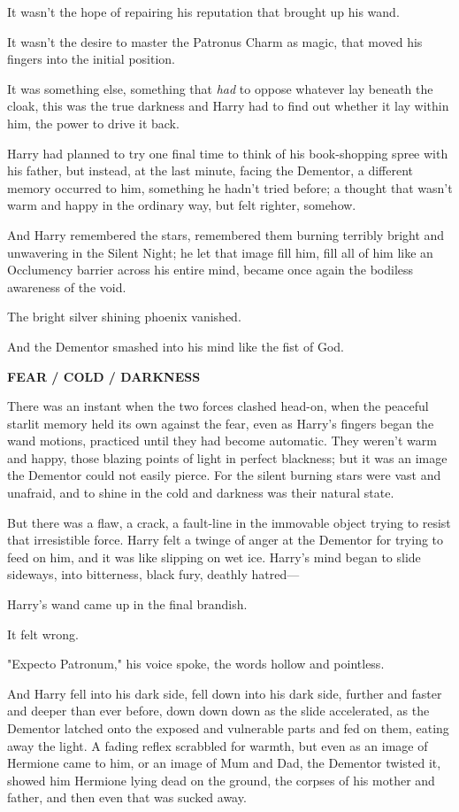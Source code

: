It wasn't the hope of repairing his reputation that brought up his wand.

It wasn't the desire to master the Patronus Charm as magic, that moved his
fingers into the initial position.

It was something else, something that \emph{had} to oppose whatever lay beneath
the cloak, this was the true darkness and Harry had to find out whether it lay
within him, the power to drive it back.

Harry had planned to try one final time to think of his book-shopping spree
with his father, but instead, at the last minute, facing the Dementor, a
different memory occurred to him, something he hadn't tried before; a thought
that wasn't warm and happy in the ordinary way, but felt righter, somehow.

And Harry remembered the stars, remembered them burning terribly bright and
unwavering in the Silent Night; he let that image fill him, fill all of him
like an Occlumency barrier across his entire mind, became once again the
bodiless awareness of the void.

The bright silver shining phoenix vanished.

And the Dementor smashed into his mind like the fist of God.

\textbf{FEAR / COLD / DARKNESS}

There was an instant when the two forces clashed head-on, when the peaceful
starlit memory held its own against the fear, even as Harry's fingers began the
wand motions, practiced until they had become automatic. They weren't warm and
happy, those blazing points of light in perfect blackness; but it was an image
the Dementor could not easily pierce. For the silent burning stars were vast
and unafraid, and to shine in the cold and darkness was their natural state.

But there was a flaw, a crack, a fault-line in the immovable object trying to
resist that irresistible force. Harry felt a twinge of anger at the Dementor
for trying to feed on him, and it was like slipping on wet ice. Harry's mind
began to slide sideways, into bitterness, black fury, deathly hatred---

Harry's wand came up in the final brandish.

It felt wrong.

"Expecto Patronum," his voice spoke, the words hollow and pointless.

And Harry fell into his dark side, fell down into his dark side, further and
faster and deeper than ever before, down down down as the slide accelerated, as
the Dementor latched onto the exposed and vulnerable parts and fed on them,
eating away the light. A fading reflex scrabbled for warmth, but even as an
image of Hermione came to him, or an image of Mum and Dad, the Dementor twisted
it, showed him Hermione lying dead on the ground, the corpses of his mother and
father, and then even that was sucked away.

